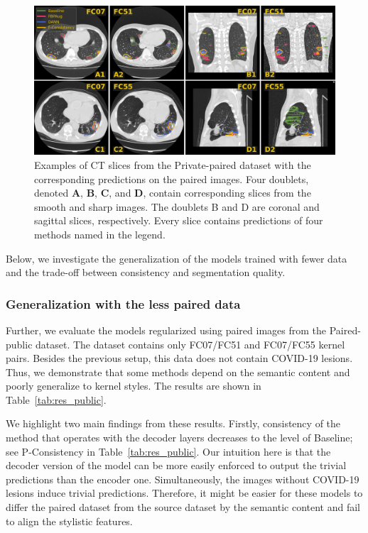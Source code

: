 \begin{figure}[h]
	\includegraphics[width=\textwidth]{Dissertation/Figures/3_ct/consistency_preds.png}
	\caption{Examples of CT slices from the Private-paired dataset with the corresponding predictions on the paired images. Four doublets, denoted \textbf{A}, \textbf{B}, \textbf{C}, and \textbf{D}, contain corresponding slices from the smooth and sharp images. The doublets B and D are coronal and sagittal slices, respectively. Every slice contains predictions of four methods named in the legend.\label{fig:consistency_preds}}
\end{figure}

Below, we investigate the generalization of the models trained with fewer data and the trade-off between consistency and segmentation quality.


\subsubsection{Generalization with the less paired data}

Further, we evaluate the models regularized using paired images from the Paired-public dataset. The dataset contains only FC07/FC51 and FC07/FC55 kernel pairs. Besides the previous setup, this data does not contain COVID-19 lesions. Thus, we demonstrate that some methods depend on the semantic content and poorly generalize to kernel styles. The results are shown in Table~\ref{tab:res_public}.



We highlight two main findings from these results. Firstly, consistency of the method that operates with the decoder layers decreases to the level of Baseline; see P-Consistency in Table~\ref{tab:res_public}. Our intuition here is that the decoder version of the model can be more easily enforced to output the trivial predictions than the encoder one. Simultaneously, the images without COVID-19 lesions induce trivial predictions. Therefore, it might be easier for these models to differ the paired dataset from the source dataset by the semantic content and fail to align the stylistic features.

